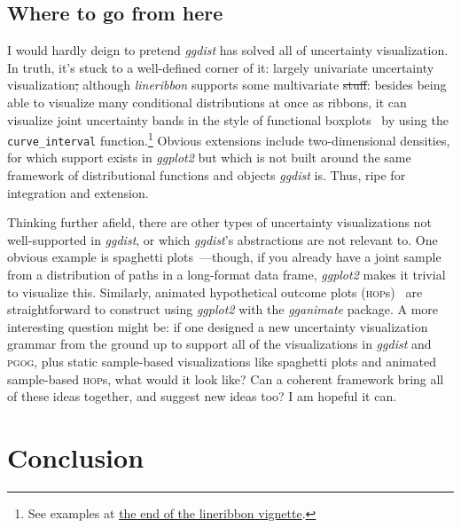 \documentclass[journal]{vgtc}                     %
\providecommand{\DIFadd}[1]{{\protect\color{blue}\uwave{#1}}} %
\providecommand{\DIFdel}[1]{{\protect\color{red}\sout{#1}}}                      %
\providecommand{\DIFaddbegin}{} %
\providecommand{\DIFaddend}{} %
\providecommand{\DIFdelbegin}{} %
\providecommand{\DIFdelend}{} %
\begin{document}
\subsection{Where to go from here}

I would hardly deign to pretend \textit{ggdist} has solved all of uncertainty visualization. In truth, it's stuck to a well-defined corner of it: largely univariate uncertainty visualization\DIFdelbegin \DIFdel{; }\DIFdelend \DIFaddbegin \DIFadd{, }\DIFaddend although \textit{lineribbon} supports some multivariate \DIFdelbegin \DIFdel{stuff}\DIFdelend \DIFaddbegin \DIFadd{chart types}\DIFaddend : besides being able to visualize many conditional distributions at once as ribbons, it can visualize joint uncertainty bands in the style of functional boxplots~\cite{sun2011functional,mirzargar2014curve,juul2021fixed} by using \DIFaddbegin \DIFadd{it with }\DIFaddend the \texttt{curve\_interval} function.\footnote{See examples at \href{https://mjskay.github.io/ggdist/articles/lineribbon.html\#curve-boxplots-aka-lineribbons-with-joint-intervals-or-curvewise-intervals}{the end of the lineribbon vignette}.} Obvious extensions include two-dimensional densities, for which support exists in \textit{ggplot2} but which is not built around the same framework of distributional functions and objects \DIFaddbegin \DIFadd{that }\DIFaddend \textit{ggdist} is. Thus, ripe for integration and extension.

Thinking further afield, there are other types of uncertainty visualizations not well-supported in \textit{ggdist}, or which \textit{ggdist}'s abstractions are not relevant to. One obvious example is spaghetti plots~\cite{cox2013visualizing,liu2018visualizing}---though, if you already have a joint sample from a distribution of paths in a long-format data frame, \textit{ggplot2} makes it trivial to visualize this. Similarly, animated hypothetical outcome plots (\textsc{hop}s)~\cite{hullman2015hypothetical,kale2018hypothetical} are straightforward to construct using \textit{ggplot2} with the \textit{gganimate} package. A more interesting question might be: if one designed a new uncertainty visualization grammar from the ground up to support all of the  visualizations in \textit{ggdist} and \textsc{pgog}, plus static sample-based visualizations like spaghetti plots and animated sample-based \textsc{hop}s, what would it look like? Can a coherent framework bring all of these ideas together, and suggest new ideas too? I am hopeful it can.

\section{Conclusion}
\end{document}
